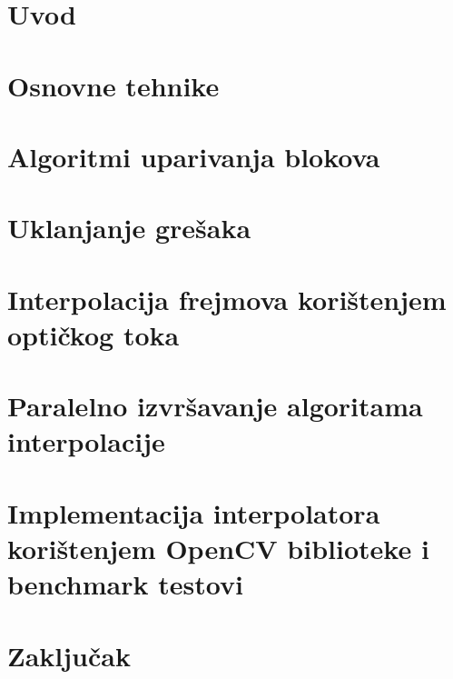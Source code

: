 \documentclass[12pt]{report}
\newcommand{\ch}{\v{c}}
\newcommand{\sh}{\v{s}}
\begin{document}
\tableofcontents

\chapter{Uvod}


\chapter{Osnovne tehnike}


\chapter{Algoritmi uparivanja blokova}


\chapter{Uklanjanje gre\sh aka}


\chapter{Interpolacija frejmova kori\sh tenjem opti\ch kog toka}

\chapter{Paralelno izvr\sh avanje algoritama interpolacije}

\chapter{Implementacija interpolatora kori\sh tenjem OpenCV biblioteke i benchmark testovi}

\chapter{Zaklju\ch ak}
\end{document}

